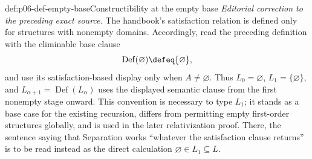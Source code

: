 \begin{hbconvention}{def:p06-def-empty-base}{Constructibility at the empty base}
\emph{Editorial correction to the preceding exact source.}
The handbook's satisfaction relation is defined only for structures with
nonempty domains.  Accordingly, read the preceding definition with the
eliminable base clause
\[
  \operatorname{Def}(\varnothing)\defeq\{\varnothing\},
\]
and use its satisfaction-based display only when \(A\ne\varnothing\).  Thus
\(L_0=\varnothing\), \(L_1=\{\varnothing\}\), and
\(L_{\alpha+1}=\operatorname{Def}(L_\alpha)\) uses the displayed semantic
clause from the first nonempty stage onward.  This convention is necessary to
type \(L_1\); it stands as a base case for the existing recursion, differs
from permitting empty first-order structures globally, and is used in the
later relativization proof.  There, the sentence saying that Separation works
“whatever the satisfaction clause returns” is to be read instead as the
direct calculation \(\varnothing\in L_1\subseteq L\).
\end{hbconvention}
